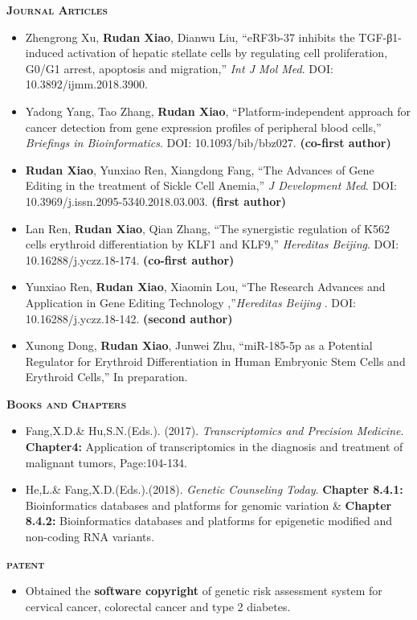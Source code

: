%
%


{\fontsize{13pt}\textbf{\textsc{Journal Articles}} }
\begin{itemize}
	\item Zhengrong Xu, \textbf{Rudan Xiao}, Dianwu Liu, ``eRF3b-37 inhibits the TGF-β1-induced activation of hepatic stellate cells by regulating cell proliferation, G0/G1 arrest, apoptosis and migration,''  \emph{Int J Mol Med}. DOI: 10.3892/ijmm.2018.3900.
	
	\item Yadong Yang, Tao Zhang, \textbf{Rudan Xiao}, ``Platform-independent approach for cancer detection from gene expression profiles of peripheral blood cells,''  \emph{Briefings in Bioinformatics}. DOI: 10.1093/bib/bbz027.
	\textbf{(co-first author)}
	
	\item \textbf{Rudan Xiao}, Yunxiao Ren, Xiangdong Fang, ``The Advances of Gene Editing in the treatment of Sickle Cell Anemia,'' \emph{J Development Med}.   DOI: 10.3969/j.issn.2095-5340.2018.03.003. \textbf{(first author)}
	
	\item Lan Ren, \textbf{Rudan Xiao}, Qian Zhang, ``The synergistic regulation of K562 cells erythroid differentiation by KLF1 and KLF9,'' \emph{Hereditas Beijing}. DOI: 10.16288/j.yczz.18-174. \textbf{(co-first author)}
	
	\item Yunxiao Ren, \textbf{Rudan Xiao}, Xiaomin Lou, ``The Research Advances and Application in Gene Editing Technology ,''\emph{Hereditas Beijing} . DOI: 10.16288/j.yczz.18-142. \textbf{(second author)}
	
	\item Xunong Dong, \textbf{Rudan Xiao}, Junwei Zhu, ``miR-185-5p as a Potential Regulator for Erythroid Differentiation in Human Embryonic Stem Cells and Erythroid Cells,'' In preparation.
	
\end{itemize}

{\fontsize{13pt}\textbf{\textsc{Books and Chapters}} }
\begin{itemize}
	\item Fang,X.D.& Hu,S.N.(Eds.). (2017). \emph{Transcriptomics and Precision Medicine}. \textbf{Chapter4:} Application of transcriptomics in the diagnosis and treatment of malignant tumors, Page:104-134. 
	\item He,L.& Fang,X.D.(Eds.).(2018). \emph{Genetic Counseling Today}. \textbf{Chapter 8.4.1:} Bioinformatics databases and platforms for genomic variation \& \textbf{Chapter 8.4.2:} Bioinformatics databases and platforms for epigenetic modified and non-coding RNA variants. 
\end{itemize}

{\fontsize{13pt}\textbf{\textsc{patent}} }
\begin{itemize}
	\item Obtained the \textbf{software copyright} of genetic risk assessment system for cervical cancer, colorectal cancer and type 2 diabetes.
\end{itemize}